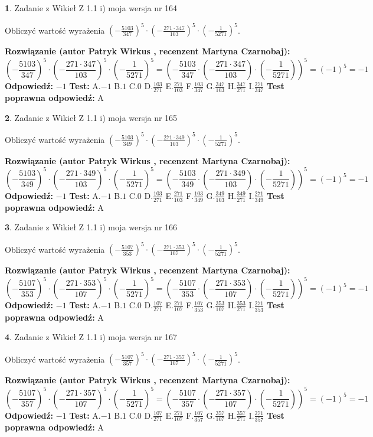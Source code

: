 \documentclass[12pt, a4paper]{article}
\theoremstyle{definition} %
\newtheorem{zad}{}
\newcommand{\zadStart}[1]{\begin{zad}#1\newline}
\newcommand{\zadStop}{\end{zad}}
\newcommand{\rozwStart}[2]{\noindent \textbf{Rozwiązanie (autor #1 , recenzent #2): }\newline}
\newcommand{\rozwStop}{\newline}
\newcommand{\odpStart}{\noindent \textbf{Odpowiedź:}\newline}
\newcommand{\odpStop}{\newline}
\newcommand{\testStart}{\noindent \textbf{Test:}\newline}
\newcommand{\testStop}{\newline}
\newcommand{\kluczStart}{\noindent \textbf{Test poprawna odpowiedź:}\newline}
\newcommand{\kluczStop}{\newline}
\begin{document}
\zadStart{Zadanie z Wikieł Z 1.1 i) moja wersja nr 164}

Obliczyć wartość wyrażenia $(-\frac{5103}{347})^{5} \cdot (-\frac{271 \cdot 347}{103})^{5} \cdot (-\frac{1}{5271})^{5}$.
\zadStop
\rozwStart{Patryk Wirkus}{Martyna Czarnobaj}
$$(-\frac{5103}{347})^{5} \cdot (-\frac{271 \cdot 347}{103})^{5} \cdot (-\frac{1}{5271})^{5} = (-\frac{5103}{347} \cdot (-\frac{271 \cdot 347}{103}) \cdot (-\frac{1}{5271}))^{5} = (-1)^{5} = -1$$
\rozwStop
\odpStart
$-1$
\odpStop
\testStart
A.$-1$ B.$1$ C.$0$ D.$\frac{103}{271}$ E.$\frac{271}{103}$
F.$\frac{103}{347}$ G.$\frac{347}{103}$
H.$\frac{347}{271}$
I.$\frac{271}{347}$
\testStop
\kluczStart
A
\kluczStop



\zadStart{Zadanie z Wikieł Z 1.1 i) moja wersja nr 165}

Obliczyć wartość wyrażenia $(-\frac{5103}{349})^{5} \cdot (-\frac{271 \cdot 349}{103})^{5} \cdot (-\frac{1}{5271})^{5}$.
\zadStop
\rozwStart{Patryk Wirkus}{Martyna Czarnobaj}
$$(-\frac{5103}{349})^{5} \cdot (-\frac{271 \cdot 349}{103})^{5} \cdot (-\frac{1}{5271})^{5} = (-\frac{5103}{349} \cdot (-\frac{271 \cdot 349}{103}) \cdot (-\frac{1}{5271}))^{5} = (-1)^{5} = -1$$
\rozwStop
\odpStart
$-1$
\odpStop
\testStart
A.$-1$ B.$1$ C.$0$ D.$\frac{103}{271}$ E.$\frac{271}{103}$
F.$\frac{103}{349}$ G.$\frac{349}{103}$
H.$\frac{349}{271}$
I.$\frac{271}{349}$
\testStop
\kluczStart
A
\kluczStop



\zadStart{Zadanie z Wikieł Z 1.1 i) moja wersja nr 166}

Obliczyć wartość wyrażenia $(-\frac{5107}{353})^{5} \cdot (-\frac{271 \cdot 353}{107})^{5} \cdot (-\frac{1}{5271})^{5}$.
\zadStop
\rozwStart{Patryk Wirkus}{Martyna Czarnobaj}
$$(-\frac{5107}{353})^{5} \cdot (-\frac{271 \cdot 353}{107})^{5} \cdot (-\frac{1}{5271})^{5} = (-\frac{5107}{353} \cdot (-\frac{271 \cdot 353}{107}) \cdot (-\frac{1}{5271}))^{5} = (-1)^{5} = -1$$
\rozwStop
\odpStart
$-1$
\odpStop
\testStart
A.$-1$ B.$1$ C.$0$ D.$\frac{107}{271}$ E.$\frac{271}{107}$
F.$\frac{107}{353}$ G.$\frac{353}{107}$
H.$\frac{353}{271}$
I.$\frac{271}{353}$
\testStop
\kluczStart
A
\kluczStop



\zadStart{Zadanie z Wikieł Z 1.1 i) moja wersja nr 167}

Obliczyć wartość wyrażenia $(-\frac{5107}{357})^{5} \cdot (-\frac{271 \cdot 357}{107})^{5} \cdot (-\frac{1}{5271})^{5}$.
\zadStop
\rozwStart{Patryk Wirkus}{Martyna Czarnobaj}
$$(-\frac{5107}{357})^{5} \cdot (-\frac{271 \cdot 357}{107})^{5} \cdot (-\frac{1}{5271})^{5} = (-\frac{5107}{357} \cdot (-\frac{271 \cdot 357}{107}) \cdot (-\frac{1}{5271}))^{5} = (-1)^{5} = -1$$
\rozwStop
\odpStart
$-1$
\odpStop
\testStart
A.$-1$ B.$1$ C.$0$ D.$\frac{107}{271}$ E.$\frac{271}{107}$
F.$\frac{107}{357}$ G.$\frac{357}{107}$
H.$\frac{357}{271}$
I.$\frac{271}{357}$
\testStop
\kluczStart
A
\kluczStop
\end{document}
